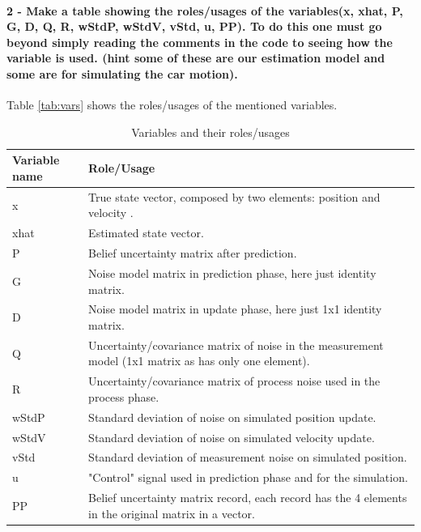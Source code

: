 \documentclass[12pt]{article}
\begin{document}
\paragraph{2 - Make a table showing the roles/usages of the variables(x, xhat, P, G, D, Q, R, wStdP, wStdV, vStd, u, PP). To do this one must go beyond simply reading the comments in the code to seeing how the variable is used. (hint some of these are our estimation model and some are for simulating the car motion).}
Table \ref{tab:vars} shows the roles/usages of the mentioned variables.
\begin{table}[]
\centering
\caption{Variables and their roles/usages \label{tab:vars}}
\label{my-label}
\begin{tabular}{l | p{5cm}}
\textbf{Variable name} & \textbf{Role/Usage} \\\hline
x                      & True state vector, composed by two elements: position and velocity	.                    \\
xhat                   & Estimated state vector.\\
P                      & Belief uncertainty matrix after prediction.                    \\
G                      & Noise model matrix in prediction phase, here just identity matrix.\\
D                      & Noise model matrix in update phase, here just 1x1 identity matrix.                    \\
Q                      & Uncertainty/covariance matrix of noise in the measurement model (1x1 matrix as has only one element).                    \\
R                      & Uncertainty/covariance matrix of process noise used in the process phase.\\
wStdP                  & Standard deviation of noise on simulated position update.\\
wStdV                  & Standard deviation of noise on simulated velocity update.\\
vStd                   & Standard deviation of measurement noise on simulated position.\\
u                      & "Control" signal used in prediction phase and for the simulation.                     \\
PP                     & Belief uncertainty matrix record, each record has the 4 elements in the original matrix in a vector.                   
\end{tabular}
\end{table}
\end{document}
